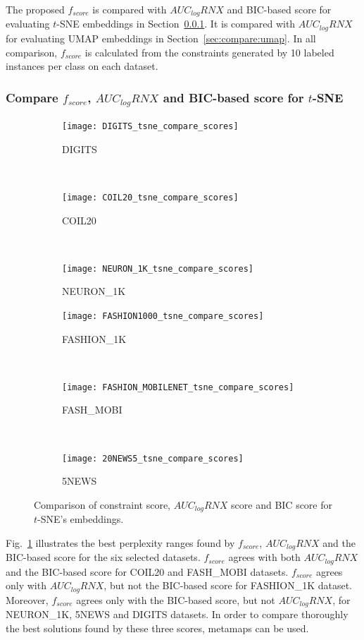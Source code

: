 The proposed $f_{score}$ is compared with $AUC_{log}RNX$ and BIC-based score for evaluating $t$-SNE embeddings in Section~\ref{sec:compare:tnse}.
It is compared with $AUC_{log}RNX$ for evaluating UMAP embeddings in Section~\ref{sec:compare:umap}.
In all comparison, $f_{score}$ is calculated from the constraints generated by 10 labeled instances per class on each dataset.

\subsubsection{Compare $f_{score}$, $AUC_{log}RNX$ and BIC-based score for $t$-SNE}\label{sec:compare:tnse}

\begin{figure}
    \centering
    \begin{subfigure}[b]{0.3\linewidth}
        \centering
        \texttt{[image: DIGITS\_tsne\_compare\_scores]}
        \caption{DIGITS}
    \end{subfigure}
    ~
    \begin{subfigure}[b]{0.3\linewidth}
        \texttt{[image: COIL20\_tsne\_compare\_scores]}
        \caption{COIL20}
    \end{subfigure}
    ~
    \begin{subfigure}[b]{0.3\linewidth}
        \texttt{[image: NEURON\_1K\_tsne\_compare\_scores]}
        \caption{NEURON\_1K}
    \end{subfigure}
    \vfill
    \begin{subfigure}[b]{0.3\linewidth}
        \centering
        \texttt{[image: FASHION1000\_tsne\_compare\_scores]}
        \caption{FASHION\_1K}
    \end{subfigure}
    ~
    \begin{subfigure}[b]{0.3\linewidth}
        \texttt{[image: FASHION\_MOBILENET\_tsne\_compare\_scores]}
        \caption{FASH\_MOBI}
    \end{subfigure}
    ~
    \begin{subfigure}[b]{0.3\linewidth}
        \texttt{[image: 20NEWS5\_tsne\_compare\_scores]}
        \caption{5NEWS}
    \end{subfigure}
    \caption{Comparison of constraint score, $AUC_{log}RNX$ score and BIC score for $t$-SNE's embeddings.}
    \label{fig:tsne:compare}
\end{figure}

Fig.~\ref{fig:tsne:compare} illustrates the best perplexity ranges found by $f_{score}$, $AUC_{log}RNX$ and the BIC-based score for the six selected datasets.
$f_{score}$ agrees with both $AUC_{log}RNX$ and the BIC-based score for COIL20 and {FASH\_MOBI} datasets.
$f_{score}$ agrees only with $AUC_{log}RNX$, but not the BIC-based score for {FASHION\_1K} dataset.
Moreover, $f_{score}$ agrees only with the BIC-based score, but not $AUC_{log}RNX$, for {NEURON\_1K}, 5NEWS and DIGITS datasets.
In order to compare thoroughly the best solutions found by these three scores, metamaps can be used.

